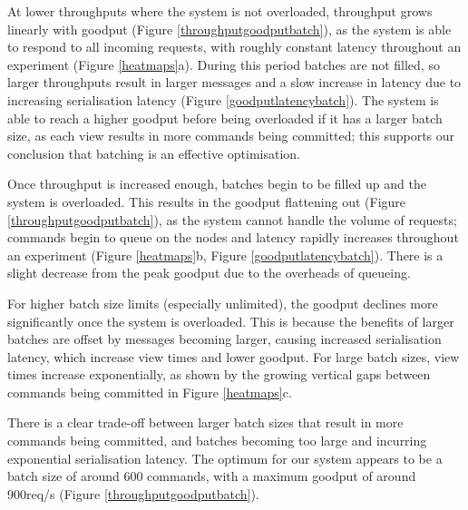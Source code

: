 At lower throughputs where the system is not overloaded, throughput grows linearly with goodput (Figure \ref{throughputgoodputbatch}), as the system is able to respond to all incoming requests, with roughly constant latency throughout an experiment (Figure \ref{heatmaps}a). During this period batches are not filled, so larger throughputs result in larger messages and a slow increase in latency due to increasing serialisation latency (Figure \ref{goodputlatencybatch}). The system is able to reach a higher goodput before being overloaded if it has a larger batch size, as each view results in more commands being committed; this supports our conclusion that batching is an effective optimisation.

Once throughput is increased enough, batches begin to be filled up and the system is overloaded. This results in the goodput flattening out (Figure \ref{throughputgoodputbatch}), as the system cannot handle the volume of requests; commands begin to queue on the nodes and latency rapidly increases throughout an experiment (Figure \ref{heatmaps}b, Figure \ref{goodputlatencybatch}). There is a slight decrease from the peak goodput due to the overheads of queueing.

For higher batch size limits (especially unlimited), the goodput declines more significantly once the system is overloaded. This is because the benefits of larger batches are offset by messages becoming larger, causing increased serialisation latency, which increase view times and lower goodput. For large batch sizes, view times increase exponentially, as shown by the growing vertical gaps between commands being committed in Figure \ref{heatmaps}c.

There is a clear trade-off between larger batch sizes that result in more commands being committed, and batches becoming too large and incurring exponential serialisation latency. The optimum for our system appears to be a batch size of around 600 commands, with a maximum goodput of around 900req/s (Figure \ref{throughputgoodputbatch}).


